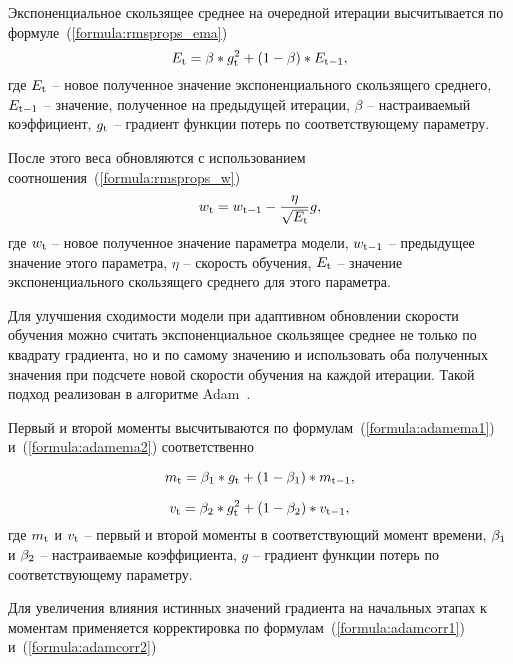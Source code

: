 Экспоненциальное скользящее среднее на очередной итерации высчитывается по формуле~(\ref{formula:rmsprops_ema})
\begin{equation}\label{formula:rmsprops_ema}
	E_{\rm{t}} = \beta * g_{\rm{t}}^2 + (1 - \beta) * E_{\rm{t-1}},
\end{equation}
где $E_{\rm{t}}$ -- новое полученное значение экспоненциального скользящего среднего, $E_{\rm{t-1}}$ -- значение, полученное на предыдущей итерации, $\beta$ -- настраиваемый коэффициент, $g_{\rm{t}}$ -- градиент функции потерь по соответствующему параметру.

После этого веса обновляются с использованием соотношения~(\ref{formula:rmsprops_w})
\begin{equation}\label{formula:rmsprops_w}
	w_{\rm{t}} = w_{\rm{t-1}} - \frac{\eta}{\sqrt{E_{\rm{t}}}}g,
\end{equation}
где $w_{\rm{t}}$ -- новое полученное значение параметра модели, $w_{\rm{t-1}}$ -- предыдущее значение этого параметра, $\eta$ -- скорость обучения, $E_{\rm{t}}$ -- значение экспоненциального скользящего среднего для этого параметра.

Для улучшения сходимости модели при адаптивном обновлении скорости обучения можно считать экспоненциальное скользящее среднее не только по квадрату градиента, но и по самому значению и использовать оба полученных значения при подсчете новой скорости обучения на каждой итерации. 
Такой подход реализован в алгоритме Adam~\cite{zhang2024transformers}.

Первый и второй моменты высчитываются по формулам~(\ref{formula:adamema1}) и~(\ref{formula:adamema2}) соответственно

\begin{equation}\label{formula:adamema1}
	m_{\rm{t}} = \beta_{\rm{1}} * g_{\rm{t}} + (1 - \beta_{\rm{1}}) * m_{\rm{t-1}},
\end{equation}

\begin{equation}\label{formula:adamema2}
	v_{\rm{t}} = \beta_{\rm{2}} * g_{\rm{t}}^2 + (1 - \beta_{\rm{2}}) * v_{\rm{t-1}},
\end{equation}
где $m_{\rm{t}}$ и $v_{\rm{t}}$ -- первый и второй моменты в соответствующий момент времени, $\beta_{\rm{1}}$ и $\beta_{\rm{2}}$ -- настраиваемые коэффициента, $g$ -- градиент функции потерь по соответствующему параметру.

Для увеличения влияния истинных значений градиента на начальных этапах к моментам применяется корректировка по формулам~(\ref{formula:adamcorr1}) и~(\ref{formula:adamcorr2})

